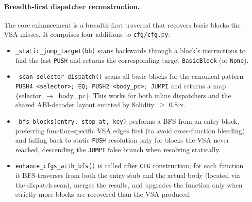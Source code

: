\documentclass{stylefiles/capstone}
\begin{document}
\paragraph{Breadth-first dispatcher reconstruction.}
The core enhancement is a breadth-first traversal that recovers basic blocks the
VSA misses. It comprises four additions to \texttt{cfg/cfg.py}:
\begin{itemize}
  \item \texttt{\_static\_jump\_target(bb)} scans backwards through a block's
        instructions to find the last \texttt{PUSH} and returns the corresponding
        target \texttt{BasicBlock} (or \texttt{None}).
  \item \texttt{\_scan\_selector\_dispatch()} scans all basic blocks for the
        canonical pattern
        \texttt{PUSH4 <selector>; EQ; PUSH2 <body\_pc>; JUMPI} and returns a map
        \{selector~$\rightarrow$~body\_pc\}. This works for both inline dispatchers
        and the shared ABI-decoder layout emitted by Solidity~$\geq$ 0.8.x.
  \item \texttt{\_bfs\_blocks(entry, stop\_at, key)} performs a BFS from an entry
        block, preferring function-specific VSA edges first (to avoid
        cross-function bleeding) and falling back to static \texttt{PUSH}
        resolution only for blocks the VSA never reached, descending the
        \texttt{JUMPI} false branch when resolving statically.
  \item \texttt{enhance\_cfgs\_with\_bfs()} is called after \texttt{CFG}
        construction; for each function it BFS-traverses from both the entry stub
        and the actual body (located via the dispatch scan), merges the results,
        and upgrades the function only when strictly more blocks are recovered than
        the VSA produced.
\end{itemize}
\end{document}
